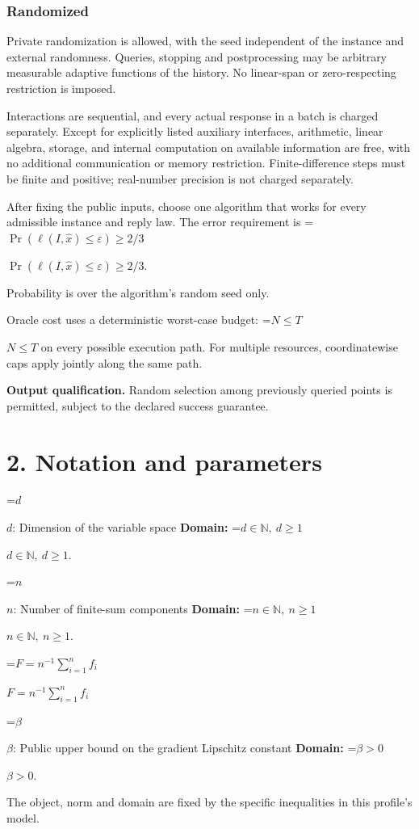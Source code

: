 \documentclass[10pt,a4paper]{article}
\newcommand{\AtlasMath}[1]{\par\begingroup\centering\setbox0=\hbox{$\displaystyle #1$}\ifdim\wd0>1.4\linewidth\typeout{ATLAS WIDE FORMULA: \the\wd0}\fi\ifdim\wd0>\linewidth\resizebox{\linewidth}{!}{\box0}\else\box0\fi\par\endgroup}
\newcommand{\AtlasInlineMath}[1]{\begingroup\setbox0=\hbox{$#1$}\ifdim\wd0>.4\linewidth\endgroup\AtlasMath{#1}\else\endgroup$#1$\fi}
\begin{document}
\subsubsection{Randomized}
Private randomization is allowed, with the seed independent of the instance and external randomness. Queries, stopping and postprocessing may be arbitrary measurable adaptive functions of the history. No linear-span or zero-respecting restriction is imposed.

Interactions are sequential, and every actual response in a batch is charged separately. Except for explicitly listed auxiliary interfaces, arithmetic, linear algebra, storage, and internal computation on available information are free, with no additional communication or memory restriction. Finite-difference steps must be finite and positive; real-number precision is not charged separately.

After fixing the public inputs, choose one algorithm that works for every admissible instance and reply law. The error requirement is \AtlasInlineMath{\Pr(\ell(I,\widehat{x})\le \varepsilon)\ge2/3}.

Probability is over the algorithm's random seed only.

Oracle cost uses a deterministic worst-case budget: \AtlasInlineMath{N\le T} on every possible execution path. For multiple resources, coordinatewise caps apply jointly along the same path.

\textbf{Output qualification.} Random selection among previously queried points is permitted, subject to the declared success guarantee.

\section{2. Notation and parameters}
\AtlasInlineMath{d}: Dimension of the variable space \textbf{Domain:} \AtlasInlineMath{d\in\mathbb{N},\ d\ge1}.

\AtlasInlineMath{n}: Number of finite-sum components \textbf{Domain:} \AtlasInlineMath{n\in\mathbb{N},\ n\ge1}.

\AtlasInlineMath{F=n^{-1}\sum_{i=1}^n f_i}

\AtlasInlineMath{\beta}: Public upper bound on the gradient Lipschitz constant \textbf{Domain:} \AtlasInlineMath{\beta>0}.

The object, norm and domain are fixed by the specific inequalities in this profile's model.
\end{document}
